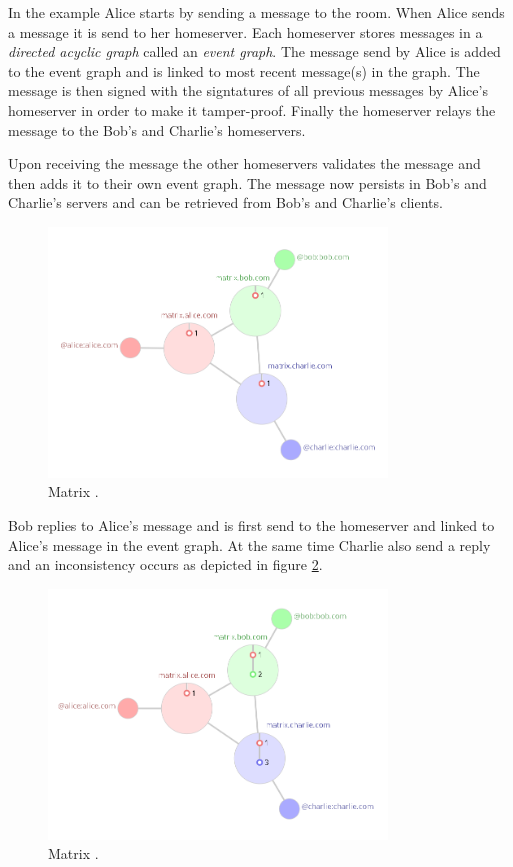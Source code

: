 In the example Alice starts by sending a message to the room. When Alice sends a message it is send to her homeserver. Each homeserver stores messages in a \emph{directed acyclic graph} called an \emph{event graph}. The message send by Alice is added to the event graph and is linked to most recent message(s) in the graph. The message is then signed with the signtatures of all previous messages by Alice's homeserver in order to make it tamper-proof. Finally the homeserver relays the message to the Bob's and Charlie's homeservers.

Upon receiving the message the other homeservers validates the message and then adds it to their own event graph. The message now persists in Bob's and Charlie's servers and can be retrieved from Bob's and Charlie's clients.

\begin{figure}[H]
	\centering
	\includegraphics[width=9cm]{figures/matrix1.png}
	\caption{ Matrix \cite{matrixhome}.}
	\label{fig:matrix1}
\end{figure}

Bob replies to Alice's message and is first send to the homeserver and linked to Alice's message in the event graph. At the same time Charlie also send a reply and an inconsistency occurs as depicted in figure \ref{fig:matrix2}.


\begin{figure}[H]
	\centering
	\includegraphics[width=9cm]{figures/matrix2.png}
	\caption{ Matrix \cite{matrixhome}.}
	\label{fig:matrix2}
\end{figure}


